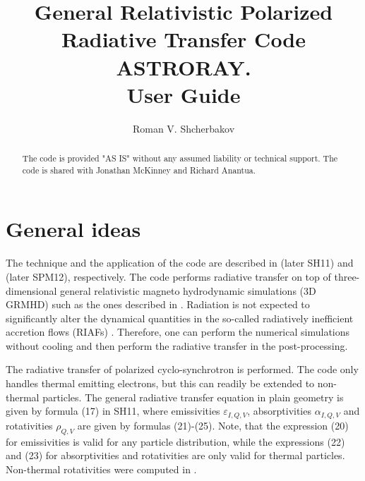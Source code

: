 \documentclass{emulateapj}
\begin{document}
\title{General Relativistic Polarized Radiative Transfer Code ASTRORAY. \\User Guide}

\author{Roman V. Shcherbakov}

\setcounter{page}{1}


\begin{abstract}
The code is provided "AS IS" without any assumed liability or technical support.
The code is shared with Jonathan McKinney and Richard Anantua.
\end{abstract}


\section{General ideas}
The technique and the application of the code are described in \citet{Shcherbakov:2011inter} (later SH11) and \citet{Shcherbakov:2012appl} (later SPM12), respectively.
The code performs radiative transfer on top of three-dimensional general relativistic magneto hydrodynamic simulations (3D GRMHD) such as the ones described in
\citet{Penna:2010dj,Tchekhovskoy:2011qp,McKinney2012,Narayan:2012dw}. Radiation is not expected to significantly alter the dynamical quantities in the
so-called radiatively inefficient accretion flows (RIAFs) \citep{Narayan:1998re,Quataert:2001op}. Therefore, one can perform the numerical simulations
without cooling and then perform the radiative transfer in the post-processing.

The radiative transfer of polarized cyclo-synchrotron is performed. The code only handles thermal emitting electrons, but this can readily be extended to non-thermal particles.
The general radiative transfer equation in plain geometry is given by formula (17) in SH11, where emissivities $\varepsilon_{I,Q,V}$, absorptivities $\alpha_{I,Q,V}$ and rotativities
$\rho_{Q,V}$ are given by formulas (21)-(25). Note, that the expression (20) for emissivities is valid for any particle distribution, while the expressions (22) and (23)
for absorptivities and rotativities are only valid for thermal particles. Non-thermal rotativities were computed in \citet{Huang:2011de}.
\end{document}
